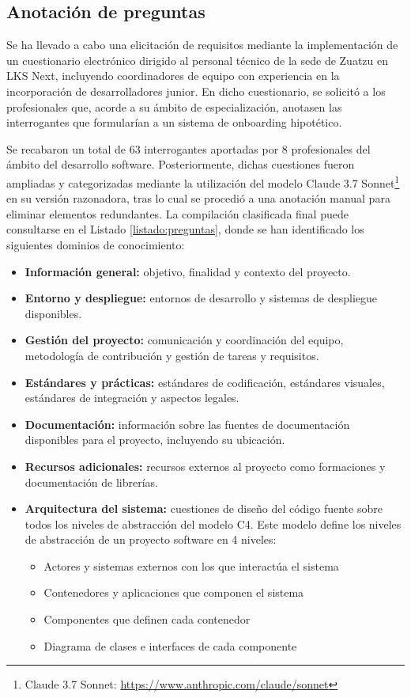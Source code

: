 \subsection{Anotación de preguntas}
Se ha llevado a cabo una elicitación de requisitos mediante la implementación de un cuestionario electrónico dirigido al personal técnico de la sede de Zuatzu en LKS Next, incluyendo coordinadores de equipo con experiencia en la incorporación de desarrolladores junior. En dicho cuestionario, se solicitó a los profesionales que, acorde a su ámbito de especialización, anotasen las interrogantes que formularían a un sistema de onboarding hipotético.

Se recabaron un total de 63 interrogantes aportadas por 8 profesionales del ámbito del desarrollo software. Posteriormente, dichas cuestiones fueron ampliadas y categorizadas mediante la utilización del modelo Claude 3.7 Sonnet\footnote{Claude 3.7 Sonnet: \url{https://www.anthropic.com/claude/sonnet}} en su versión razonadora, tras lo cual se procedió a una anotación manual para eliminar elementos redundantes. La compilación clasificada final puede consultarse en el Listado \ref{listado:preguntas}, donde se han identificado los siguientes dominios de conocimiento:

\begin{itemize}
\item\textbf{Información general: }objetivo, finalidad y contexto del proyecto.
\item\textbf{Entorno y despliegue: }entornos de desarrollo y sistemas de despliegue disponibles.
\item\textbf{Gestión del proyecto: }comunicación y coordinación del equipo, metodología de contribución y gestión de tareas y requisitos.
\item\textbf{Estándares y prácticas: }estándares de codificación, estándares visuales, estándares de integración y aspectos legales.
\item\textbf{Documentación: }información sobre las fuentes de documentación disponibles para el proyecto, incluyendo su ubicación.
\item\textbf{Recursos adicionales: }recursos externos al proyecto como formaciones y documentación de librerías.
\item\textbf{Arquitectura del sistema: }cuestiones de diseño del código fuente sobre todos los niveles de abstracción del modelo C4\cite{noauthor_c4_nodate}. Este modelo define los niveles de abstracción de un proyecto software en 4 niveles:
\begin{itemize}
\item Actores y sistemas externos con los que interactúa el sistema
\item Contenedores y aplicaciones que componen el sistema
\item Componentes que definen cada contenedor
\item Diagrama de clases e interfaces de cada componente
\end{itemize}
\end{itemize}

